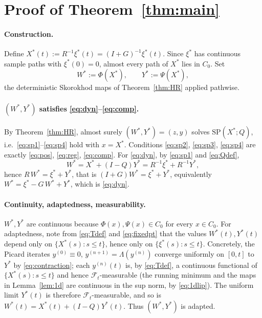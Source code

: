 \documentclass{amsart}
\theoremstyle{definition}
\theoremstyle{remark}
\begin{document}
\section{Proof of Theorem~\ref{thm:main}}

\paragraph{Construction.}
Define $X^\ast(t):=R^{-1}\xi^\ast(t)=(I+G)^{-1}\xi^\ast(t)$. Since $\xi^\ast$
has continuous sample paths with $\xi^\ast(0)=0$, almost every path of
$X^\ast$ lies in $C_0$. Set
\begin{equation}\label{eq:WYdef}
  W^\ast:=\Phi(X^\ast),\qquad Y^\ast:=\Psi(X^\ast),
\end{equation}
the deterministic Skorokhod maps of Theorem~\ref{thm:HR} applied pathwise.

\paragraph{$(W^\ast,Y^\ast)$ satisfies \eqref{eq:dyn}--\eqref{eq:comp}.}
By Theorem~\ref{thm:HR}, almost surely $(W^\ast,Y^\ast)=(z,y)$ solves
$\mathrm{SP}(X^\ast;Q)$, i.e.\ \eqref{eq:sp1}--\eqref{eq:sp4} hold with
$x=X^\ast$. Conditions \eqref{eq:sp2}, \eqref{eq:sp3}, \eqref{eq:sp4} are
exactly \eqref{eq:pos}, \eqref{eq:reg}, \eqref{eq:comp}. For \eqref{eq:dyn}, by
\eqref{eq:sp1} and \eqref{eq:Qdef},
\[
  W^\ast=X^\ast+(I-Q)Y^\ast=R^{-1}\xi^\ast+R^{-1}Y^\ast,
\]
hence $R\,W^\ast=\xi^\ast+Y^\ast$, that is
$(I+G)W^\ast=\xi^\ast+Y^\ast$, equivalently
$W^\ast=\xi^\ast-G\,W^\ast+Y^\ast$, which is \eqref{eq:dyn}.

\paragraph{Continuity, adaptedness, measurability.}
$W^\ast,Y^\ast$ are continuous because $\Phi(x),\Psi(x)\in C_0$ for every
$x\in C_0$. For adaptedness, note from \eqref{eq:Tdef} and \eqref{eq:fixedpt}
that the values $W^\ast(t),Y^\ast(t)$ depend only on $\{X^\ast(s):s\le t\}$,
hence only on $\{\xi^\ast(s):s\le t\}$. Concretely, the Picard iterates
$y^{(0)}\equiv0$, $y^{(n+1)}=\Lambda(y^{(n)})$ converge uniformly on $[0,t]$ to
$Y^\ast$ by \eqref{eq:contraction}; each $y^{(n)}(t)$ is, by \eqref{eq:Tdef}, a
continuous functional of $\{X^\ast(s):s\le t\}$ and hence
$\mathcal F_t$-measurable (the running minimum and the maps in
Lemma~\ref{lem:1d} are continuous in the sup norm, by \eqref{eq:1dlip}). The
uniform limit $Y^\ast(t)$ is therefore $\mathcal F_t$-measurable, and so is
$W^\ast(t)=X^\ast(t)+(I-Q)Y^\ast(t)$. Thus $(W^\ast,Y^\ast)$ is adapted.
\end{document}
